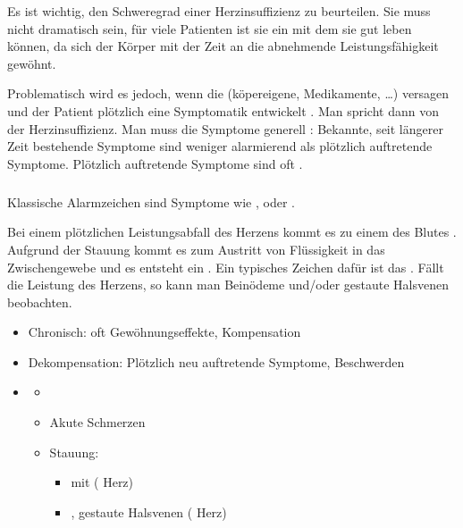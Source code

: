 {%
Es ist wichtig, den Schweregrad einer Herzinsuffizienz zu
beurteilen. Sie muss nicht dramatisch sein, für viele
Patienten ist sie ein  mit dem sie
gut leben können, da sich der Körper mit der Zeit an die
abnehmende Leistungsfähigkeit gewöhnt.

Problematisch wird es jedoch, wenn die
 (köpereigene, Medikamente,
{\dots}) versagen und der Patient plötzlich eine Symptomatik
entwickelt . Man spricht dann von der 
Herzinsuffizienz. Man muss die Symptome generell : Bekannte, seit längerer Zeit
bestehende Symptome sind weniger alarmierend als plötzlich
auftretende Symptome. Plötzlich auftretende Symptome sind
oft .

\subparagraph{}
Klassische Alarmzeichen sind Symptome wie
,  oder . 

Bei einem plötzlichen Leistungsabfall des  Herzens
kommt es zu einem  des Blutes . Aufgrund der Stauung kommt es zum Austritt
von Flüssigkeit in das Zwischengewebe und es entsteht ein
. Ein typisches Zeichen dafür ist
das . Fällt die Leistung des 
Herzens, so kann man Beinödeme und/oder gestaute Halsvenen
beobachten.
}{%
\begin{itemize}
  \item Chronisch: oft Gewöhnungseffekte, Kompensation
  \item Dekompensation: Plötzlich neu auftretende
  Symptome, Beschwerden
  \item {}
  \begin{itemize}
    \item {}
    \item  {Akute Schmerzen}
    \item Stauung:
    \begin{itemize}
      \item {} mit  ( Herz)
      \item {}, gestaute Halsvenen (
      Herz)
    \end{itemize}
  \end{itemize}
\end{itemize}
}{}{}{}




